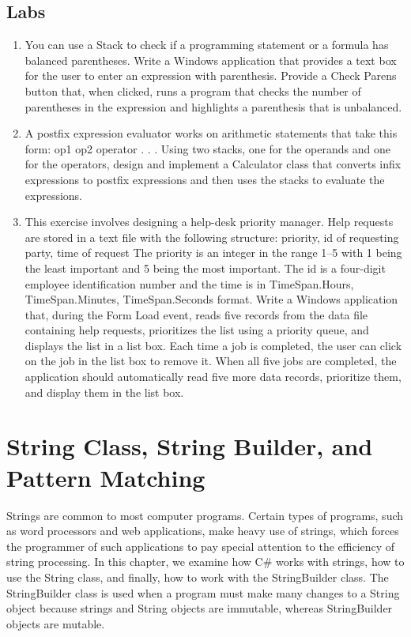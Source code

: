 \documentclass[12pt,a4paper,final,twoside,titlepage]{book}
\begin{document}
\section{Labs}
\begin{enumerate}
\item You can use a Stack to check if a programming statement or a formula has balanced parentheses. Write a Windows application that provides a text box for the user to enter an expression with parenthesis. Provide a Check Parens button that, when clicked, runs a program that checks the number of parentheses in the expression and highlights a parenthesis that is unbalanced.
\item A postfix expression evaluator works on arithmetic statements that take this form: op1 op2 operator . . . Using two stacks, one for the operands and one for the operators, design and implement a Calculator class that converts infix expressions to postfix expressions and then uses the stacks to evaluate the expressions.
\item This exercise involves designing a help-desk priority manager. Help requests are stored in a text file with the following structure: priority, id of requesting party, time of request The priority is an integer in the range 1–5 with 1 being the least important and 5 being the most important. The id is a four-digit employee identification number and the time is in TimeSpan.Hours, TimeSpan.Minutes, TimeSpan.Seconds format. Write a Windows application that, during the Form Load event, reads five records from the data file containing help requests, prioritizes the list using a priority queue, and displays the list in a list box. Each time a job is completed, the user can click on the job in the list box to remove it. When all five jobs are completed, the application should automatically read five more data records, prioritize them, and display them in the list box.
\end{enumerate}

\chapter{String Class, String Builder, and Pattern Matching}
Strings are common to most computer programs. Certain types of programs, such as word processors and web applications, make heavy use of strings, which forces the programmer of such applications to pay special attention to the efficiency of string processing. In this chapter, we examine how C\# works with strings, how to use the String class, and finally, how to work with the StringBuilder class. The StringBuilder class is used when a program must make many changes to a String object because strings and String objects are immutable, whereas StringBuilder objects are mutable.
\end{document}
